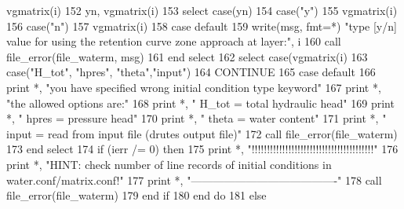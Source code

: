 \begin{DoxyCode}
{{{{{      vgmatrix\textcolor{comment}{(i)%
152 \textcolor{comment}{                                                        yn, vgmatrix(i)%
153 \textcolor{comment}{          }\textcolor{keywordflow}{select case}(yn)
154             \textcolor{keywordflow}{case}(\textcolor{stringliteral}{"y"})
155               vgmatrix(i)%
156             \textcolor{keywordflow}{case}(\textcolor{stringliteral}{"n"})
157               vgmatrix(i)%
158 \textcolor{keywordflow}{            case default}
159               \textcolor{keyword}{write}(msg, fmt=*) \textcolor{stringliteral}{"type [y/n] value for using the retention curve zone approach at layer:"}\textcolor{comment}{, i}
160 \textcolor{comment}{              }\textcolor{keyword}{call }file_error(file_waterm, msg)
161 \textcolor{keywordflow}{          end select}
162           \textcolor{keywordflow}{select case}(vgmatrix(i)%
163             \textcolor{keywordflow}{case}(\textcolor{stringliteral}{"H\_tot"}, \textcolor{stringliteral}{"hpres"}, \textcolor{stringliteral}{"theta"},\textcolor{stringliteral}{"input"})
164               \textcolor{keywordflow}{CONTINUE}
165 \textcolor{keywordflow}{            case default}
166               print *, \textcolor{stringliteral}{"you have specified wrong initial condition type keyword"}
167               print *, \textcolor{stringliteral}{"the allowed options are:"}
168               print *, \textcolor{stringliteral}{"                        H\_tot = total hydraulic head"}
169               print *, \textcolor{stringliteral}{"                        hpres = pressure head"}
170               print *, \textcolor{stringliteral}{"                        theta = water content"}
171               print *, \textcolor{stringliteral}{"                        input = read from input file (drutes output file)"}
172               \textcolor{keyword}{call }file_error(file_waterm)
173 \textcolor{keywordflow}{          end select}
174           \textcolor{keywordflow}{if} (ierr /= 0) \textcolor{keywordflow}{then}
175             print *, \textcolor{stringliteral}{"!!!!!!!!!!!!!!!!!!!!!!!!!!!!!!!!!!!!!!!!"}
176             print *, \textcolor{stringliteral}{"HINT: check number of line records of initial conditions in water.conf/matrix.conf!"}
177             print *, \textcolor{stringliteral}{"----------------------------------------"}
178             \textcolor{keyword}{call }file_error(file_waterm)
179 \textcolor{keywordflow}{          end if}
180 \textcolor{keywordflow}{        end do}
181       \textcolor{keywordflow}{else}
}}}}}}}
\end{DoxyCode}
